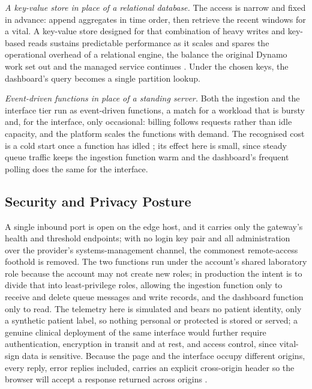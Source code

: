 \documentclass[conference]{IEEEtran}
\begin{document}
\textit{A key-value store in place of a relational database.} The access is narrow and fixed in advance: append aggregates in time order, then retrieve the recent windows for a vital. A key-value store designed for that combination of heavy writes and key-based reads sustains predictable performance as it scales and spares the operational overhead of a relational engine, the balance the original Dynamo work set out and the managed service continues \cite{decandia2007, elhemali2022}. Under the chosen keys, the dashboard's query becomes a single partition lookup.

\textit{Event-driven functions in place of a standing server.} Both the ingestion and the interface tier run as event-driven functions, a match for a workload that is bursty and, for the interface, only occasional: billing follows requests rather than idle capacity, and the platform scales the functions with demand. The recognised cost is a cold start once a function has idled \cite{wang2018}; its effect here is small, since steady queue traffic keeps the ingestion function warm and the dashboard's frequent polling does the same for the interface.

\subsection{Security and Privacy Posture}

A single inbound port is open on the edge host, and it carries only the gateway's health and threshold endpoints; with no login key pair and all administration over the provider's systems-management channel, the commonest remote-access foothold is removed. The two functions run under the account's shared laboratory role because the account may not create new roles; in production the intent is to divide that into least-privilege roles, allowing the ingestion function only to receive and delete queue messages and write records, and the dashboard function only to read. The telemetry here is simulated and bears no patient identity, only a synthetic patient label, so nothing personal or protected is stored or served; a genuine clinical deployment of the same interface would further require authentication, encryption in transit and at rest, and access control, since vital-sign data is sensitive. Because the page and the interface occupy different origins, every reply, error replies included, carries an explicit cross-origin header so the browser will accept a response returned across origins \cite{barth2011}.
\end{document}

